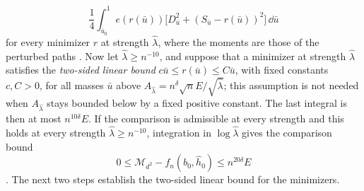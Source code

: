 \[
 \frac14\int_{{\bar u}_0}^1e(r({\bar u}))\bigl[D_{\bar u}^2+(S_{\bar u}-r({\bar u}))^2\bigr]\,\dd {\bar u}
\]
for every minimizer $r$ at strength ${\widehat\lambda}$, where the moments are those of the perturbed paths \cite[Lemma~3.1]{oai-fluctuations}. Now let ${\widehat\lambda}\ge n^{-10}$, and suppose that a minimizer at strength ${\widehat\lambda}$ satisfies the \emph{two-sided linear bound} $c\bar u\le r(\bar u)\le C\bar u$, with fixed constants $c,C>0$, for all masses ${\bar u}$ above $A_{\widehat\lambda}=n^\delta\sqrt nE/\sqrt{\widehat\lambda}$; this assumption is not needed when $A_{\widehat\lambda}$ stays bounded below by a fixed positive constant. The last integral is then at most $n^{10\delta}E$. If the comparison is admissible at every strength and this holds at every strength ${\widehat\lambda}\ge n^{-10}$, integration in $\log{\widehat\lambda}$ gives the comparison bound
\begin{equation}\label{eq:fl-comparison-bound}
 0\le\mathcal M_{d^2}-f_n(b_0,{\widehat h}_0)\le n^{20\delta}E
\end{equation}
\cite[Propositions~3.9 and~3.10]{oai-fluctuations}. The next two steps establish the two-sided linear bound for the minimizers.

